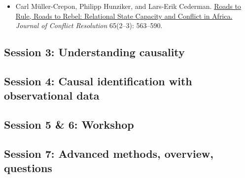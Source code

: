 \documentclass[12pt, a4paper]{article}
\begin{document}
\begin{itemize}
  \item Carl Müller-Crepon, Philipp Hunziker, and Lars-Erik Cederman. \href{https://journals.sagepub.com/doi/10.1177/0022002720963674}{Roads to Rule, Roads to Rebel: Relational State Capacity and Conflict in Africa.} \textit{Journal of Conflict Resolution} 65(2--3): 563--590.
\end{itemize}

\subsection*{Session 3: Understanding causality}


\subsection*{Session 4: Causal identification with observational data}


\subsection*{Session 5 \& 6: Workshop}


\subsection*{Session 7: Advanced methods, overview, questions}
\end{document}
